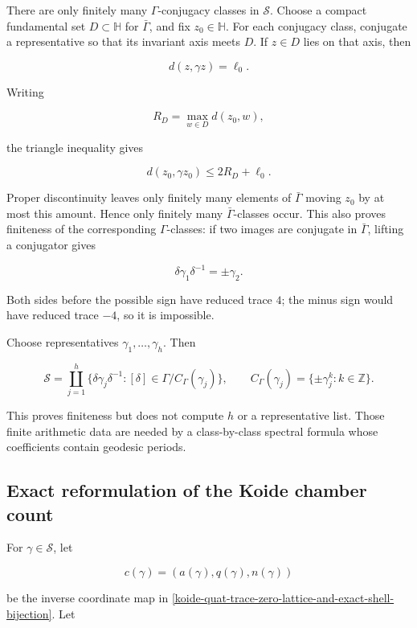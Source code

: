 There are only finitely many \(\Gamma\)-conjugacy classes in \(\mathscr S\). Choose a compact fundamental set \(D\subset\mathbb H\) for \(\bar\Gamma\), and fix \(z_0\in\mathbb H\). For each conjugacy class, conjugate a representative so that its invariant axis meets \(D\). If \(z\in D\) lies on that axis, then

\[
 d(z,\gamma z)=\ell_0.
\]

Writing

\[
 R_D=\max_{w\in D}d(z_0,w),
\]

the triangle inequality gives

\[
 d(z_0,\gamma z_0)\le2R_D+\ell_0.
\]

Proper discontinuity leaves only finitely many elements of \(\bar\Gamma\) moving \(z_0\) by at most this amount. Hence only finitely many \(\bar\Gamma\)-classes occur. This also proves finiteness of the corresponding \(\Gamma\)-classes: if two images are conjugate in \(\bar\Gamma\), lifting a conjugator gives

\[
 \delta\gamma_1\delta^{-1}=\pm\gamma_2.
\]

Both sides before the possible sign have reduced trace \(4\); the minus sign would have reduced trace \(-4\), so it is impossible.

Choose representatives \(\gamma_1,\ldots,\gamma_h\). Then

\begin{equation}\label{koide-quat-eq-shell-class-decomposition}
 \boxed{
 \mathscr S=
 \coprod_{j=1}^h
 \{\delta\gamma_j\delta^{-1}:
 [\delta]\in\Gamma/C_\Gamma(\gamma_j)\},
 \qquad
 C_\Gamma(\gamma_j)=\{\pm\gamma_j^k:k\in\mathbb Z\}.}
\end{equation}

This proves finiteness but does not compute \(h\) or a representative list. Those finite arithmetic data are needed by a class-by-class spectral formula whose coefficients contain geodesic periods.

\subsection{Exact reformulation of the Koide chamber count}\label{koide-quat-exact-reformulation-of-the-koide-chamber-count}

For \(\gamma\in\mathscr S\), let

\[
 c(\gamma)=(a(\gamma),q(\gamma),n(\gamma))
\]

be the inverse coordinate map in
\cref{koide-quat-trace-zero-lattice-and-exact-shell-bijection}. Let

